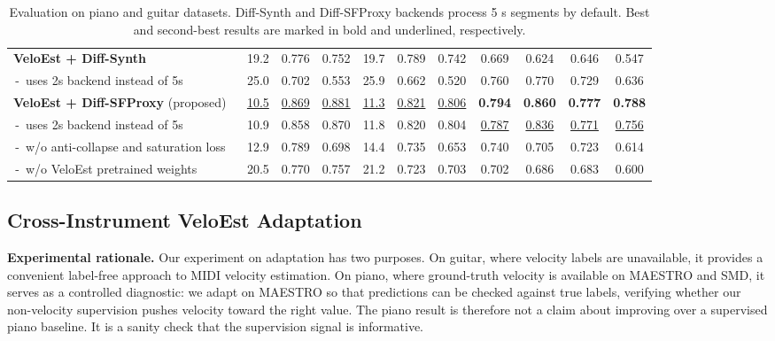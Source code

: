 \documentclass{article}
\begin{document}
\begin{table}[htbp]
\begin{tabular}{l||ccc|ccc||cc|cc}
        \textbf{VeloEst + Diff-Synth} & 19.2 & 0.776 & 0.752 & 19.7 & 0.789 & 0.742 & 0.669 & 0.624 & 0.646 & 0.547 \\
        \,-\, uses 2s backend instead of 5s
        & 25.0 & 0.702 & 0.553 & 25.9 & 0.662 & 0.520 & 0.760 & 0.770 & 0.729 & 0.636 \\
        \midrule
        \textbf{VeloEst + Diff-SFProxy} (proposed) \,\, & \underline{10.5} & \underline{0.869} & \underline{0.881}
        & \underline{11.3} & \underline{0.821} & \underline{0.806}
        & \textbf{0.794} & \textbf{0.860} & \textbf{0.777} & \textbf{0.788} \\
        \,-\, uses 2s backend instead of 5s
        & 10.9 & 0.858 & 0.870 & 11.8 & 0.820 & 0.804
        & \underline{0.787} & \underline{0.836} & \underline{0.771} & \underline{0.756} \\
        \,-\, w/o anti-collapse and saturation loss
        & 12.9 & 0.789 & 0.698 & 14.4 & 0.735 & 0.653 & 0.740 & 0.705 & 0.723 & 0.614
        \\
        \,-\, w/o VeloEst pretrained weights
        & 20.5 & 0.770 & 0.757 & 21.2 & 0.723 & 0.703 & 0.702 & 0.686 & 0.683 & 0.600 \\
        \bottomrule
    \end{tabular}%
    \caption{Evaluation on piano and guitar datasets. Diff-Synth and Diff-SFProxy backends process 5 s segments by default. Best and second-best results are marked in bold and underlined, respectively.}
    \label{tab:unified_results}
\end{table}
 
\subsection{Cross-Instrument VeloEst Adaptation}
\label{sec:velocity_exp}

\textbf{Experimental rationale.}
Our experiment on adaptation has two purposes. On guitar, where velocity labels are unavailable, it provides a convenient label-free approach to MIDI velocity estimation.
On piano, where ground-truth velocity is available on MAESTRO and SMD, it serves as a controlled diagnostic: we adapt on MAESTRO so that predictions can be checked against true labels, verifying whether our non-velocity supervision pushes velocity toward the right value. The piano result is therefore not a claim about improving over a supervised piano baseline. It is a sanity check that the supervision signal is informative.
\end{document}
